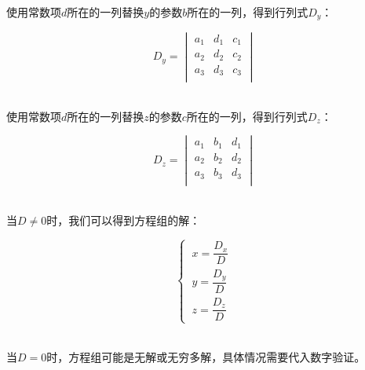 \documentclass[UTF8]{ctexart}
\begin{document}
    使用常数项$d$所在的一列替换$y$的参数$b$所在的一列，得到行列式$D_y$：
    \begin{large}
        \begin{equation*}
            D_y=
            \begin{vmatrix}
                a_1&d_1&c_1\\
                a_2&d_2&c_2\\
                a_3&d_3&c_3\\
            \end{vmatrix}
        \end{equation*}
    \end{large}\\
    使用常数项$d$所在的一列替换$z$的参数$c$所在的一列，得到行列式$D_z$：
    \begin{large}
        \begin{equation*}
            D_z=
            \begin{vmatrix}
                a_1&b_1&d_1\\
                a_2&b_2&d_2\\
                a_3&b_3&d_3\\
            \end{vmatrix}
        \end{equation*}
    \end{large}\\
    当$D\neq 0$时，我们可以得到方程组的解：
    \begin{large}
        \begin{equation*}
            \begin{cases}
                \ x=\dfrac{D_x}{D} \\[6mm]
                \ y=\dfrac{D_y}{D} \\[6mm]
                \ z=\dfrac{D_z}{D}
            \end{cases}
        \end{equation*}
    \end{large}\\
    当$D=0$时，方程组可能是无解或无穷多解，具体情况需要代入数字验证。\\
\end{document}
